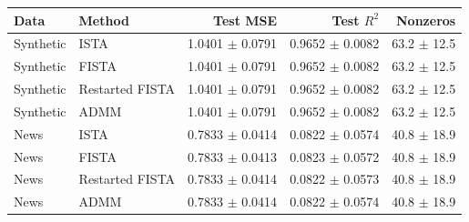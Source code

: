 \begin{tabular}{llrrr}
\toprule
Data & Method & Test MSE & Test $R^2$ & Nonzeros \\
\midrule
Synthetic & ISTA & 1.0401 $\pm$ 0.0791 & 0.9652 $\pm$ 0.0082 & 63.2 $\pm$ 12.5 \\
Synthetic & FISTA & 1.0401 $\pm$ 0.0791 & 0.9652 $\pm$ 0.0082 & 63.2 $\pm$ 12.5 \\
Synthetic & Restarted FISTA & 1.0401 $\pm$ 0.0791 & 0.9652 $\pm$ 0.0082 & 63.2 $\pm$ 12.5 \\
Synthetic & ADMM & 1.0401 $\pm$ 0.0791 & 0.9652 $\pm$ 0.0082 & 63.2 $\pm$ 12.5 \\
News & ISTA & 0.7833 $\pm$ 0.0414 & 0.0822 $\pm$ 0.0574 & 40.8 $\pm$ 18.9 \\
News & FISTA & 0.7833 $\pm$ 0.0413 & 0.0823 $\pm$ 0.0572 & 40.8 $\pm$ 18.9 \\
News & Restarted FISTA & 0.7833 $\pm$ 0.0414 & 0.0822 $\pm$ 0.0573 & 40.8 $\pm$ 18.9 \\
News & ADMM & 0.7833 $\pm$ 0.0414 & 0.0822 $\pm$ 0.0574 & 40.8 $\pm$ 18.9 \\
\bottomrule
\end{tabular}
